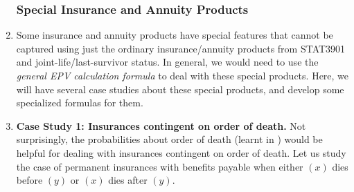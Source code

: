 \begin{enumerate}
\subsubsection*{Special Insurance and Annuity Products}
\item Some insurance and annuity products have special features that cannot be
captured using just the ordinary insurance/annuity products from STAT3901 and
joint-life/last-survivor status. In general, we would need to use the
\emph{general EPV calculation formula} to deal with these special products.
Here, we will have several case studies about these special products, and
develop some specialized formulas for them.

\item \label{it:insur-death-order} \textbf{Case Study 1: Insurances contingent
on order of death.} Not surprisingly, the probabilities about order of death
(learnt in ) would be helpful for dealing with
insurances contingent on order of death. Let us study the case of permanent
insurances with benefits payable when either \((x)\) dies before \((y)\) or
\((x)\) dies after \((y)\).


\end{enumerate}
